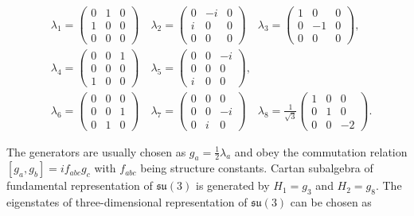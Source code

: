 \begin{align}
  &\lambda_1 = \begin{pmatrix} 0 & 1 & 0 \\ 1 & 0 & 0 \\ 0 & 0 & 0 \end{pmatrix}
  \quad
  \lambda_2 = \begin{pmatrix} 0 & -i & 0 \\ i & 0 & 0 \\ 0 & 0 & 0 \end{pmatrix}
  \quad
  \lambda_3 = \begin{pmatrix} 1 & 0 & 0 \\ 0 & -1& 0 \\ 0 & 0 & 0 \end{pmatrix}
  , \nonumber \\
  &\lambda_4 = \begin{pmatrix} 0 & 0 & 1 \\ 0 & 0 & 0 \\ 1 & 0 & 0 \end{pmatrix}
  \quad
  \lambda_5 = \begin{pmatrix} 0 & 0 & -i\\ 0 & 0 & 0 \\ i & 0 & 0 \end{pmatrix}
  , \label{eq:GellMannMatrices} \\
  &\lambda_6 = \begin{pmatrix} 0 & 0 & 0 \\ 0 & 0 & 1 \\ 0 & 1 & 0 \end{pmatrix}
  \quad
  \lambda_7 = \begin{pmatrix} 0 & 0 & 0 \\ 0 & 0 & -i\\ 0 & i & 0 \end{pmatrix}
  \quad
  \lambda_8 = \frac{1}{\sqrt{3}} \begin{pmatrix} 1 & 0 & 0 \\ 0 & 1 & 0 \\ 
                                                              0 & 0 & -2 \end{pmatrix}.
  \nonumber
\end{align}

The generators are usually chosen as $g_a = \frac{1}{2} \lambda_a$ and obey the
commutation relation $[g_a,g_b]=if_{abc}g_c$ with $f_{abc}$ being structure
constants. Cartan subalgebra of fundamental representation of $\mathfrak{su}(3)$
is generated by $H_1=g_3$ and $H_2=g_8$. The eigenstates of three-dimensional
representation of $\mathfrak{su}(3)$ can be chosen as

